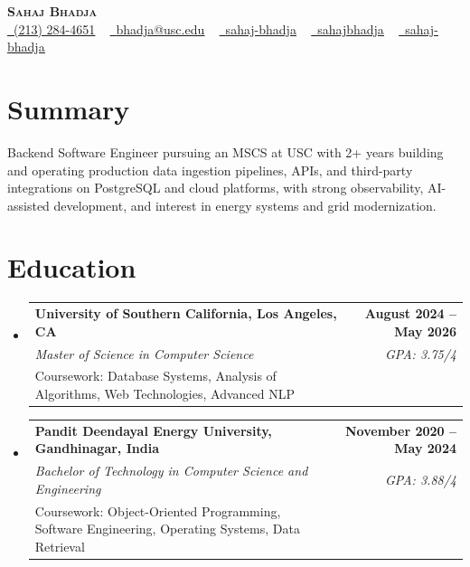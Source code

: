 \documentclass[letterpaper,10pt]{article}
\makeatletter
\newcommand{\resumeEduSubheading}[5]{\vspace{-1pt}\item\begin{tabular*}{1.0\textwidth}[t]{l@{\extracolsep{\fill}}r}\textbf{#1} & \textbf{\small #2} \\\textit{\small #3} & \textit{\small #4} \\\small #5 & \\\end{tabular*}\vspace{-4pt}}
\newcommand{\resumeSubHeadingListStart}{\begin{itemize}[leftmargin=0.0in, label={}]}
\newcommand{\resumeSubHeadingListEnd}{\end{itemize}}
\makeatother
\begin{document}
\begin{center}
{\Huge \scshape \textbf{Sahaj Bhadja}} \\ \vspace{1pt}
\small \href{tel:(213) 284-4651}{\faPhone\ \underline{(213) 284-4651}} ~ \href{mailto: bhadja@usc.edu}{\raisebox{-0.2\height}\faEnvelope\ \underline{bhadja@usc.edu}} ~
\href{https://www.linkedin.com/in/sahaj-bhadja/}{\raisebox{-0.2\height}\faLinkedin\ \underline{sahaj-bhadja}} ~ \href{https://github.com/SAHAJ-BHADJA}{\raisebox{-0.2\height}\faGithub\ \underline{sahajbhadja}} ~
\href{https://sahaj-bhadja.vercel.app/}{\raisebox{-0.2\height}\faGlobe\ \underline{sahaj-bhadja}}
\end{center}
\vspace{-16pt}
\section{Summary}
\begin{itemize}[leftmargin=0.15in, label={}]
\small{\item{Backend Software Engineer pursuing an MSCS at USC with 2+ years building and operating production data ingestion pipelines, APIs, and third-party integrations on PostgreSQL and cloud platforms, with strong observability, AI-assisted development, and interest in energy systems and grid modernization.}}
\end{itemize}
\vspace{-6pt}
\section{Education}
\resumeSubHeadingListStart
\resumeEduSubheading{University of Southern California, Los Angeles, CA}{August 2024 -- May 2026}{Master of Science in Computer Science}{GPA: 3.75/4}{Coursework: Database Systems, Analysis of Algorithms, Web Technologies, Advanced NLP}
\vspace{-9pt}
\resumeEduSubheading{Pandit Deendayal Energy University, Gandhinagar, India}{November 2020 -- May 2024}{Bachelor of Technology in Computer Science and Engineering}{GPA: 3.88/4}{Coursework: Object-Oriented Programming, Software Engineering, Operating Systems, Data Retrieval}
\resumeSubHeadingListEnd
\vspace{-6pt}
\end{document}
